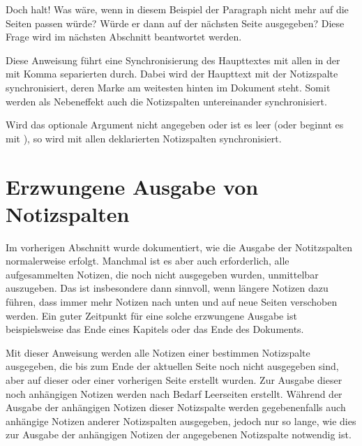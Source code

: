 Doch halt! Was wäre, wenn in diesem Beispiel der Paragraph nicht mehr auf die
Seiten passen würde? Würde er dann auf der nächsten Seite ausgegeben? Diese
Frage wird im nächsten Abschnitt beantwortet werden.
\EndIndexGroup


\begin{Declaration}
\end{Declaration}
Diese Anweisung führt eine Synchronisierung des Haupttextes mit allen in der
mit Komma separierten  durch. Dabei wird der
Haupttext mit der Notizspalte synchronisiert, deren Marke am weitesten hinten
im Dokument steht. Somit werden als Nebeneffekt auch die Notizspalten
untereinander synchronisiert.

Wird das optionale Argument nicht angegeben oder ist es leer (oder beginnt es
mit ), so wird mit allen deklarierten Notizspalten
synchronisiert.%
\EndIndexGroup


\section{Erzwungene Ausgabe von Notizspalten}

\iftrue %
Im vorherigen Abschnitt wurde dokumentiert, wie die Ausgabe der Notitzspalten
normalerweise erfolgt. Manchmal ist es aber %
\else%
Neben der normalen Ausgabe der Notizspalten, wie sie im vorherigen Abschnitt
beschrieben ist, ist es manchmal %
\fi %
auch erforderlich, alle aufgesammelten Notizen, die noch nicht ausgegeben
wurden, unmittelbar auszugeben. Das ist insbesondere dann sinnvoll, wenn
längere Notizen dazu führen, dass immer mehr Notizen nach unten und auf neue
Seiten verschoben werden. Ein guter Zeitpunkt für eine solche erzwungene
Ausgabe ist beispielsweise das Ende eines Kapitels
oder das Ende des Dokuments.

\begin{Declaration}
\end{Declaration}
Mit dieser Anweisung werden alle Notizen einer bestimmen Notizspalte
ausgegeben, die
bis zum Ende der aktuellen Seite noch nicht ausgegeben sind, aber auf dieser
oder einer vorherigen Seite erstellt wurden. Zur Ausgabe dieser noch
anhängigen Notizen werden nach Bedarf Leerseiten erstellt. Während der Ausgabe
der anhängigen Notizen dieser Notizspalte werden gegebenenfalls auch anhängige
Notizen anderer Notizspalten ausgegeben, jedoch nur so lange, wie dies zur
Ausgabe der anhängigen Notizen der angegebenen Notizspalte notwendig ist.

